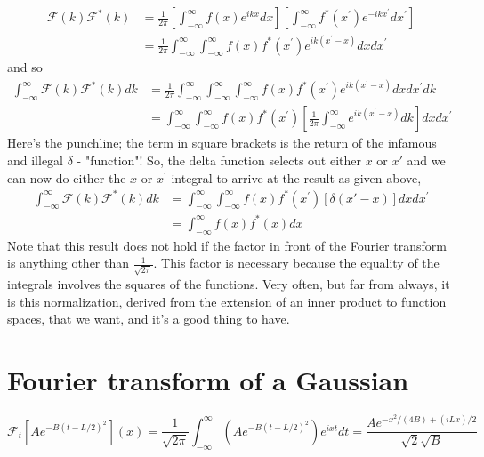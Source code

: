 \documentclass[main.tex]{subfiles}
\begin{document}
$$
\begin{aligned}
\mathcal{F}(k) \mathcal{F}^*(k) & =\frac{1}{2 \pi}\left[\int_{-\infty}^{\infty} f(x) e^{i k x} d x\right]\left[\int_{-\infty}^{\infty} f^*\left(x^{\prime}\right) e^{-i k x^{\prime}} d x^{\prime}\right] \\
& =\frac{1}{2 \pi} \int_{-\infty}^{\infty} \int_{-\infty}^{\infty} f(x) f^*\left(x^{\prime}\right) e^{i k\left(x^{\prime}-x\right)} d x d x^{\prime}
\end{aligned}
$$
and so
$$
\begin{aligned}
\int_{-\infty}^{\infty} \mathcal{F}(k) \mathcal{F}^*(k) d k & =\frac{1}{2 \pi} \int_{-\infty}^{\infty} \int_{-\infty}^{\infty} \int_{-\infty}^{\infty} f(x) f^*\left(x^{\prime}\right) e^{i k\left(x^{\prime}-x\right)} d x d x^{\prime} d k \\
& =\int_{-\infty}^{\infty} \int_{-\infty}^{\infty} f(x) f^*\left(x^{\prime}\right)\left[\frac{1}{2 \pi} \int_{-\infty}^{\infty} e^{i k\left(x^{\prime}-x\right)} d k\right] d x d x^{\prime} 
\end{aligned}
$$
Here's the punchline; the term in square brackets is the return of the infamous and illegal $\delta$ - "function"! 
So, the delta function selects out either $x$ or $x'$ and we can now do either the $x$ or $x^{\prime}$ integral to arrive at the result as given above,
\begin{align}
    \int_{-\infty}^{\infty} \mathcal{F}(k) \mathcal{F}^*(k) d k & = \int_{-\infty}^{\infty} \int_{-\infty}^{\infty} f(x) f^*\left(x^{\prime}\right)\left[\delta(x' - x)\right] d x d x^{\prime} \\
    & = \int_{-\infty}^{\infty} f(x) f^*(x) d x
\end{align}
Note that this result does not hold if the factor in front of the Fourier transform is anything other than $\frac{1}{\sqrt{2 \pi}}$. This factor is necessary because the equality of the integrals involves the squares of the functions. Very often, but far from always, it is this normalization, derived from the extension of an inner product to function spaces, that we want, and it's a good thing to have.


\section{Fourier transform of a Gaussian}

\begin{equation}
    \mathcal{F}_t\left[A e^{-B(t-L / 2)^2}\right](x) = \frac{1}{\sqrt{2 \pi}} \int_{-\infty}^{\infty}\left(A e^{-B(t-L / 2)^2}\right) e^{i x t} d t=\frac{A e^{-x^2 /(4 B)+(i L x) / 2}}{\sqrt{2} \sqrt{B}}
\end{equation}
\end{document}
